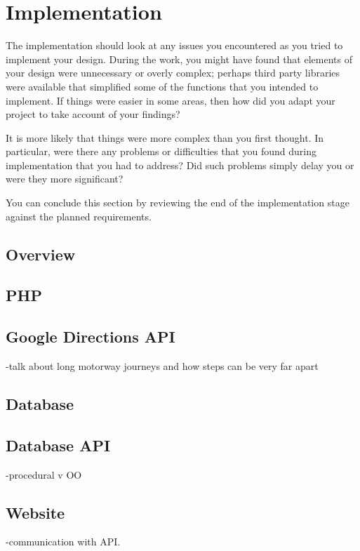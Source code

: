 \chapter{Implementation}

The implementation should look at any issues you encountered as you tried to implement your design. During the work, you might have found that elements of your design were unnecessary or overly complex; perhaps third party libraries were available that simplified some of the functions that you intended to implement. If things were easier in some areas, then how did you adapt your project to take account of your findings?

It is more likely that things were more complex than you first thought. In particular, were there any problems or difficulties that you found during implementation that you had to address? Did such problems simply delay you or were they more significant? 

You can conclude this section by reviewing the end of the implementation stage against the planned requirements. 

\section{Overview}
\section{PHP}
\section{Google Directions API}
	-talk about long motorway journeys and how steps can be very far apart
	\section{Database}
	\section{Database API}
	-procedural v OO
	\section{Website}
	-communication with API.
